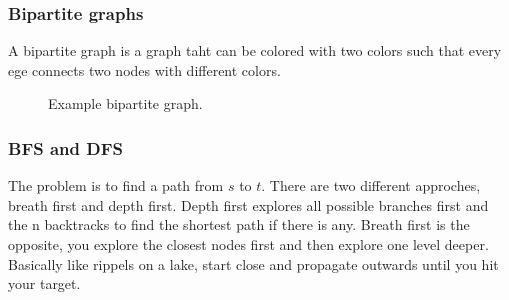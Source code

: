 \documentclass[12pt]{article} %
\begin{document}
\subsubsection{Bipartite graphs}
A bipartite graph is a graph taht can be colored with two colors such that every ege connects two nodes with different colors.

\begin{figure}[H]
\caption{Example bipartite graph.}
\label{exBiGraph}
\end{figure}

\subsubsection{BFS and DFS}
The problem is to find a path from $s$ to $t$. There are two different approches, breath first and depth first. Depth first explores all possible branches first and the n backtracks to find the shortest path if there is any. Breath first is the opposite, you explore the closest nodes first and then explore one level deeper. Basically like rippels on a lake, start close and propagate outwards until you hit your target.
\end{document}
